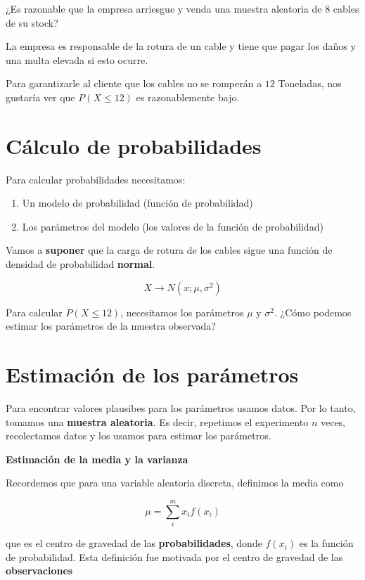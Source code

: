 \documentclass[
]{book}
\begin{document}
¿Es razonable que la empresa arriesgue y venda una muestra aleatoria de \(8\) cables de su stock?

La empresa es responsable de la rotura de un cable y tiene que pagar los daños y una multa elevada si esto ocurre.

Para garantizarle al cliente que los cables no se romperán a \(12\) Toneladas, nos gustaría ver que \(P(X \leq 12)\) es razonablemente bajo.

\hypertarget{cuxe1lculo-de-probabilidades}{%
\section{Cálculo de probabilidades}\label{cuxe1lculo-de-probabilidades}}

Para calcular probabilidades necesitamos:

\begin{enumerate}
\def\labelenumi{\arabic{enumi}.}
\item
  Un modelo de probabilidad (función de probabilidad)
\item
  Los parámetros del modelo (los valores de la función de probabilidad)
\end{enumerate}

Vamos a \textbf{suponer} que la carga de rotura de los cables sigue una función de densidad de probabilidad \textbf{normal}.

\[X \rightarrow N(x; \mu, \sigma^2)\]

Para calcular \(P(X \leq 12)\), necesitamos los parámetros \(\mu\) y \(\sigma^2\). ¿Cómo podemos estimar los parámetros de la muestra observada?

\hypertarget{estimaciuxf3n-de-los-paruxe1metros}{%
\section{Estimación de los parámetros}\label{estimaciuxf3n-de-los-paruxe1metros}}

Para encontrar valores plausibes para los parámetros usamos datos. Por lo tanto, tomamos una \textbf{muestra aleatoria}. Es decir, repetimos el experimento \(n\) veces, recolectamos datos y los usamos para estimar los parámetros.

\textbf{Estimación de la media y la varianza}

Recordemos que para una variable aleatoria discreta, definimos la media como

\[\mu=\sum_{i}^m x_if(x_i)\]

que es el centro de gravedad de las \textbf{probabilidades}, donde \(f(x_i)\) es la función de probabilidad. Esta definición fue motivada por el centro de gravedad de las \textbf{observaciones}
\end{document}
